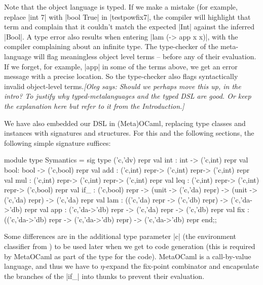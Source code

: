\documentclass[preprint]{sigplanconf}
\newcommand{\oleg}[1]{{\it [Oleg says: #1]}}
\let\cite=\citep
\begin{document}
Note that the object language is typed. If we make a mistake
(for example, replace |int 7| with |bool True| in |testpowfix7|, the
compiler will highlight that term and complain that it couldn't match
the expected |Int| against the inferred |Bool|. A type error
also results when entering |lam (\x -> app x x)|, with the compiler
complaining about an infinite type. The type-checker of the
meta-language will flag meaningless object level terms --
before any of their evaluation. If we forget, for example, |app| in
some of the terms above, we get an error message with a precise
location. So the type-checker also flags syntactically invalid
object-level terms.\oleg{Should we perhaps move this up, in the
  intro? To justify why typed-metalanguages and the typed DSL are
  good. Or keep the explanation here but refer to it from the Introduction.}

We have also embedded our DSL in (Meta)OCaml, replacing type classes
and instances with signatures and structures. For this and the 
following sections, the following simple signature suffices:

\begin{code}
module type Symantics = sig
  type ('c,'dv) repr
  val int : int  -> ('c,int) repr
  val bool: bool -> ('c,bool) repr
  val add : ('c,int) repr-> ('c,int) repr-> ('c,int) repr
  val mul : ('c,int) repr-> ('c,int) repr-> ('c,int) repr
  val leq : ('c,int) repr-> ('c,int) repr-> ('c,bool) repr
  val if_ : ('c,bool) repr ->
             (unit -> ('c,'da) repr) ->
             (unit -> ('c,'da) repr) -> ('c,'da) repr 
  val lam : (('c,'da) repr -> ('c,'db) repr) 
          -> ('c,'da->'db) repr
  val app : ('c,'da->'db) repr
    -> ('c,'da) repr -> ('c,'db) repr
  val fix : (('c,'da->'db) repr -> ('c,'da->'db) repr) 
            -> ('c,'da->'db) repr
end;;
\end{code}

Some differences are in the additional type parameter |c| (the
environment classifier from \cite{WalidPOPL03}) to be used later when we get to
code generation (this is required by MetaOCaml as part of the type for the
code). MetaOCaml is a call-by-value language, and thus we have to 
$\eta$-expand
the fix-point combinator and encapsulate the branches of the |if_|
into thunks to prevent their evaluation. 
\end{document}

